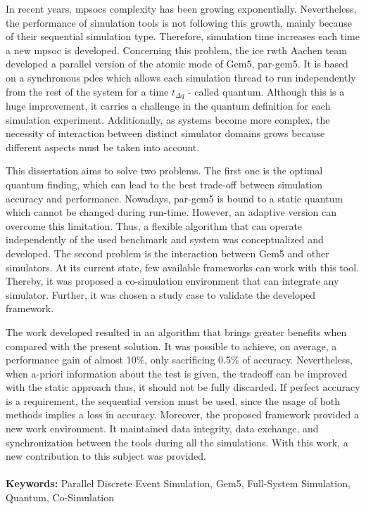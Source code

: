 





\vspace*{-0.5cm}

In recent years, \glspl{mpsoc} complexity has been growing exponentially. Nevertheless, the performance of simulation tools is not 
following this growth, mainly because of their sequential simulation type. Therefore, simulation time increases each time a new \gls{mpsoc} 
is developed. Concerning this problem, the \gls{ice} \gls{rwth} Aachen team developed a parallel version of the atomic mode of Gem5, par-gem5. 
It is based on a synchronous \gls{pdes} which allows each simulation thread to run independently from the rest of the system for a time 
$t_{\Delta q}$ - called quantum. Although this is a huge improvement, it carries a challenge in the quantum definition for each simulation experiment. 
Additionally, as systems become more complex, the necessity of interaction between distinct simulator domains grows because different aspects 
must be taken into account. 

This dissertation aims to solve two problems. The first one is the optimal quantum finding, which can lead to the best trade-off between 
simulation accuracy and performance. Nowadays, par-gem5 is bound to a static quantum which cannot be changed during run-time. However, an adaptive 
version can overcome this limitation. Thus, a flexible algorithm that can operate independently of the used benchmark and system was conceptualized and 
developed. The second problem is the interaction between Gem5 and other simulators. At its current state, few available 
frameworks can work with this tool. Thereby, it was proposed a co-simulation environment that can integrate any 
simulator. Further, it was chosen a study case to validate the developed framework.

The work developed resulted in an algorithm that brings greater benefits when compared with the present solution. It was possible to achieve, 
on average, a performance gain of almost 10\%, only sacrificing 0.5\% of accuracy. Nevertheless, when a-priori information about the 
test is given, the tradeoff can be improved with the static approach thus, it should not be fully discarded. 
If perfect accuracy is a requirement, the sequential version must be used, since the usage of both methods implies a loss in accuracy. 
Moreover, the proposed framework provided a new work environment. It maintained data integrity, data exchange, and synchronization 
between the tools during all the simulations. With this work, a new contribution to this subject was provided.

\paragraph{}\textbf{Keywords:} Parallel Discrete Event Simulation, Gem5, Full-System Simulation, Quantum, Co-Simulation
